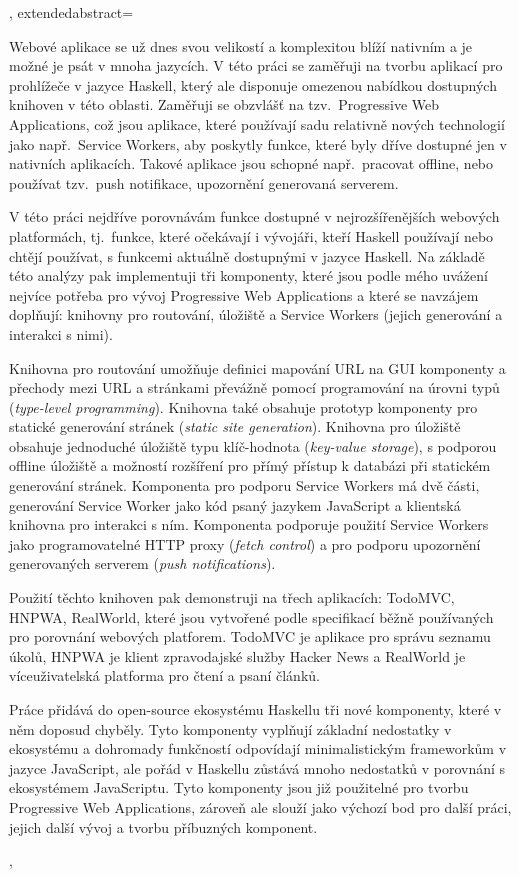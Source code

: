 {{  },
  extendedabstract={

    Webové aplikace se už dnes svou velikostí a komplexitou blíží nativním a je
    možné je psát v mnoha jazycích. V této práci se zaměřuji na tvorbu aplikací
    pro prohlížeče v jazyce Haskell, který ale disponuje omezenou nabídkou
    dostupných knihoven v této oblasti. Zaměřuji se obzvlášť na tzv.~Progressive
    Web Applications, což jsou aplikace, které používají sadu relativně nových
    technologií jako např.~Service Workers, aby poskytly funkce, které byly
    dříve dostupné jen v nativních aplikacích. Takové aplikace jsou schopné
    např.~pracovat offline, nebo používat tzv.~push notifikace, upozornění
    generovaná serverem.

    V této práci nejdříve porovnávám funkce dostupné v nejrozšířenějších
    webových platformách, tj.~funkce, které očekávají i vývojáři, kteří Haskell
    používají nebo chtějí používat, s funkcemi aktuálně dostupnými v jazyce
    Haskell. Na základě této analýzy pak implementuji tři komponenty, které jsou
    podle mého uvážení nejvíce potřeba pro vývoj Progressive Web Applications a
    které se navzájem doplňují: knihovny pro routování, úložiště a Service
    Workers (jejich generování a interakci s nimi).

    Knihovna pro routování umožňuje definici mapování URL na GUI komponenty a
    přechody mezi URL a stránkami převážně pomocí programování na úrovni typů
    (\emph{type-level programming}). Knihovna také obsahuje prototyp komponenty
    pro statické generování stránek (\emph{static site generation}). Knihovna
    pro úložiště obsahuje jednoduché úložiště typu klíč-hodnota (\emph{key-value
    storage}), s podporou offline úložiště a možností rozšíření pro přímý
    přístup k databázi při statickém generování stránek. Komponenta pro podporu
    Service Workers má dvě části, generování Service Worker jako kód psaný
    jazykem JavaScript a klientská knihovna pro interakci s ním. Komponenta
    podporuje použití Service Workers jako programovatelné HTTP proxy
    (\emph{fetch control}) a pro podporu upozornění generovaných serverem
    (\emph{push notifications}).

    Použití těchto knihoven pak demonstruji na třech aplikacích: TodoMVC, HNPWA,
    RealWorld, které jsou vytvořené podle specifikací běžně používaných pro
    porovnání webových platforem. TodoMVC je aplikace pro správu seznamu úkolů,
    HNPWA je klient zpravodajské služby Hacker News a RealWorld je
    víceuživatelská platforma pro čtení a psaní článků.

    Práce přidává do open-source ekosystému Haskellu tři nové komponenty, které
    v něm doposud chyběly. Tyto komponenty vyplňují základní nedostatky v
    ekosystému a dohromady funkčností odpovídají minimalistickým frameworkům v
    jazyce JavaScript, ale pořád v Haskellu zůstává mnoho nedostatků v porovnání
    s ekosystémem JavaScriptu. Tyto komponenty jsou již použitelné pro tvorbu
    Progressive Web Applications, zároveň ale slouží jako výchozí bod pro další
    práci, jejich další vývoj a tvorbu příbuzných komponent.

  },
}
